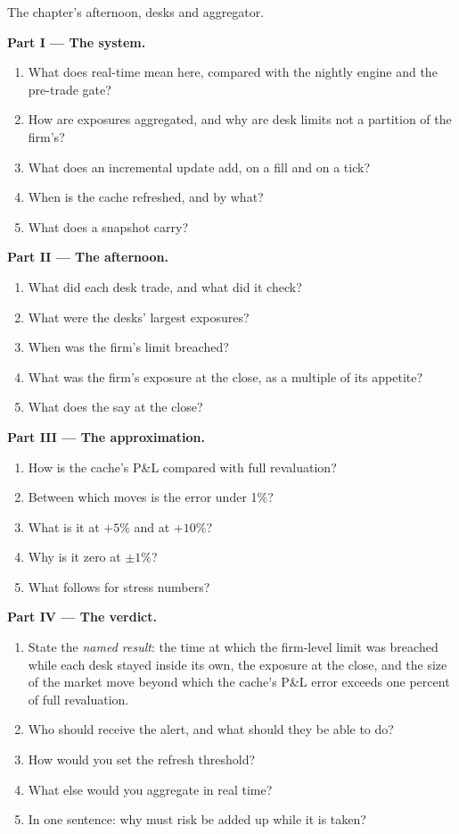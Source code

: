 \begin{problem}\label{pb:pl:real-time-risk:1}
The chapter's afternoon, desks and aggregator.

\medskip\noindent\textbf{Part I --- The system.}
\begin{enumerate}
\item What does real-time mean here, compared with the nightly engine and the pre-trade gate?
\item How are exposures aggregated, and why are desk limits not a partition of the firm's?
\item What does an incremental update add, on a fill and on a tick?
\item When is the cache refreshed, and by what?
\item What does a snapshot carry?
\end{enumerate}

\medskip\noindent\textbf{Part II --- The afternoon.}
\begin{enumerate}[resume]
\item What did each desk trade, and what did it check?
\item What were the desks' largest exposures?
\item When was the firm's limit breached?
\item What was the firm's exposure at the close, as a multiple of its appetite?
\item What does the  say at the close?
\end{enumerate}

\medskip\noindent\textbf{Part III --- The approximation.}
\begin{enumerate}[resume]
\item How is the cache's P\&L compared with full revaluation?
\item Between which moves is the error under 1\%?
\item What is it at $+5\%$ and at $+10\%$?
\item Why is it zero at $\pm1\%$?
\item What follows for stress numbers?
\end{enumerate}

\medskip\noindent\textbf{Part IV --- The verdict.}
\begin{enumerate}[resume]
\item State the \emph{named result}: the time at which the firm-level limit was breached while each desk stayed inside its own, the exposure at
the close, and the size of the market move beyond which the cache's P\&L error exceeds one percent of full revaluation.
\item Who should receive the alert, and what should they be able to do?
\item How would you set the refresh threshold?
\item What else would you aggregate in real time?
\item In one sentence: why must risk be added up while it is taken?
\end{enumerate}
\end{problem}

